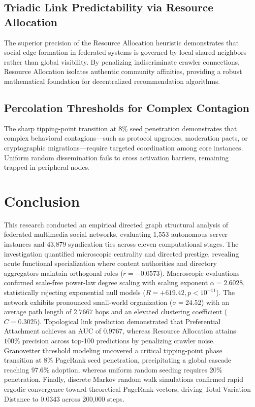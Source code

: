 \documentclass[conference]{IEEEtran}
\begin{document}
\subsection{Triadic Link Predictability via Resource Allocation}
The superior precision of the Resource Allocation heuristic demonstrates that social edge formation in federated systems is governed by local shared neighbors rather than global visibility. By penalizing indiscriminate crawler connections, Resource Allocation isolates authentic community affinities, providing a robust mathematical foundation for decentralized recommendation algorithms.

\subsection{Percolation Thresholds for Complex Contagion}
The sharp tipping-point transition at $8\%$ seed penetration demonstrates that complex behavioral contagions---such as protocol upgrades, moderation pacts, or cryptographic migrations---require targeted coordination among core instances. Uniform random dissemination fails to cross activation barriers, remaining trapped in peripheral nodes.

\section{Conclusion}

This research conducted an empirical directed graph structural analysis of federated multimedia social networks, evaluating 1,553 autonomous server instances and 43,879 syndication ties across eleven computational stages. The investigation quantified microscopic centrality and directed prestige, revealing acute functional specialization where content authorities and directory aggregators maintain orthogonal roles ($r = -0.0573$). Macroscopic evaluations confirmed scale-free power-law degree scaling with scaling exponent $\alpha = 2.6028$, statistically rejecting exponential null models ($R = +619.42, p < 10^{-11}$). The network exhibits pronounced small-world organization ($\sigma = 24.52$) with an average path length of $2.7667$ hops and an elevated clustering coefficient ($C = 0.3025$). Topological link prediction demonstrated that Preferential Attachment achieves an AUC of $0.9767$, whereas Resource Allocation attains $100\%$ precision across top-100 predictions by penalizing crawler noise. Granovetter threshold modeling uncovered a critical tipping-point phase transition at $8\%$ PageRank seed penetration, precipitating a global cascade reaching $97.6\%$ adoption, whereas uniform random seeding requires $20\%$ penetration. Finally, discrete Markov random walk simulations confirmed rapid ergodic convergence toward theoretical PageRank vectors, driving Total Variation Distance to $0.0343$ across 200,000 steps.
\end{document}
